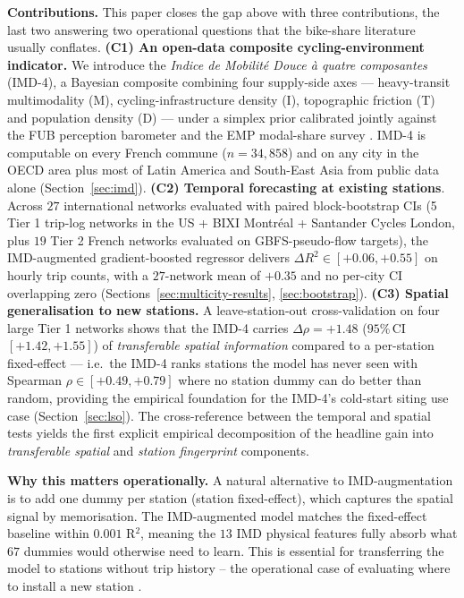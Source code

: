 \documentclass[11pt,a4paper]{article}
\begin{document}
\noindent\textbf{Contributions.}
This paper closes the gap above with three contributions, the
last two answering two operational questions that the
bike-share literature usually conflates.
\textbf{(C1) An open-data composite cycling-environment
indicator.}  We introduce the \emph{Indice de Mobilit\'e Douce
\`a quatre composantes} (IMD-4), a Bayesian composite combining
four supply-side axes — heavy-transit multimodality (M),
cycling-infrastructure density (I), topographic friction (T) and
population density (D) — under a simplex prior calibrated
jointly against the FUB perception barometer \citep{FUB2023} and
the EMP modal-share survey \citep{EMP2019}.  IMD-4 is computable
on every French commune ($n = 34{,}858$) and on any city in the
OECD area plus most of Latin America and South-East Asia from
public data alone (Section~\ref{sec:imd}).
\textbf{(C2) Temporal forecasting at existing stations}.  Across
$27$ international networks evaluated with paired
block-bootstrap CIs (5 Tier 1 trip-log networks in the US +
BIXI Montr\'eal + Santander Cycles London, plus $19$ Tier 2 French
networks evaluated on GBFS-pseudo-flow targets), the
IMD-augmented gradient-boosted regressor delivers
$\Delta R^2 \in [+0.06, +0.55]$ on hourly trip counts, with a
$27$-network mean of $+0.35$ and no per-city CI overlapping
zero (Sections~\ref{sec:multicity-results}, \ref{sec:bootstrap}).
\textbf{(C3) Spatial generalisation to new stations.}  A
leave-station-out cross-validation on four large Tier 1
networks shows that the IMD-4 carries
$\Delta \rho = +1.48$ ($95\%\,\mathrm{CI}$ $[+1.42, +1.55]$) of
\emph{transferable spatial information} compared to a per-station
fixed-effect — i.e.\ the IMD-4 ranks stations the model has
never seen with Spearman $\rho \in [+0.49, +0.79]$ where no
station dummy can do better than random, providing the empirical
foundation for the IMD-4's cold-start siting use case
(Section~\ref{sec:lso}).  The cross-reference between the
temporal and spatial tests yields the first explicit empirical
decomposition of the headline gain into
\emph{transferable spatial} and \emph{station fingerprint}
components.

\noindent\textbf{Why this matters operationally.}  A natural
alternative to IMD-augmentation is to add one dummy per station
(station fixed-effect), which captures the spatial signal by
memorisation.  The IMD-augmented model matches the fixed-effect
baseline within $0.001$ R$^2$, meaning the $13$ IMD physical
features fully absorb what $67$ dummies would otherwise need to
learn.  This is essential for transferring the model to stations
without trip history -- the operational case of evaluating where
to install a new station \citep{El-Assi2017,Ashqar2017}.
\end{document}

